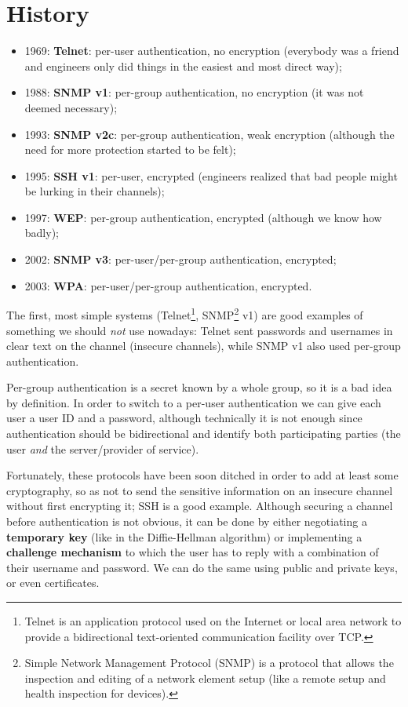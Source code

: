 
\section{History}
\begin{itemize}
	\item 1969: \textbf{Telnet}: per-user authentication, no encryption (everybody was a friend and engineers only did things in the easiest and most direct way);
	\item 1988: \textbf{SNMP v1}: per-group authentication, no encryption (it was not deemed necessary);
	\item 1993: \textbf{SNMP v2c}: per-group authentication, weak encryption (although the need for more protection started to be felt);
	\item 1995: \textbf{SSH v1}: per-user, encrypted (engineers realized that bad people might be lurking in their channels);
	\item 1997: \textbf{WEP}: per-group authentication, encrypted (although we know how badly);
	\item 2002: \textbf{SNMP v3}: per-user/per-group authentication, encrypted;
	\item 2003: \textbf{WPA}: per-user/per-group authentication, encrypted.
\end{itemize}

The first, most simple systems (Telnet\footnote{Telnet is an application protocol used on the Internet or local area network to provide a bidirectional text-oriented communication facility over TCP.}, SNMP\footnote{Simple Network Management Protocol (SNMP) is a protocol that allows the inspection and editing of a network element setup (like a remote setup and health inspection for devices).} v1) are good examples of something we should \textit{not} use nowadays: Telnet sent passwords and usernames in clear text on the channel (insecure channels), while SNMP v1 also used per-group authentication.

Per-group authentication is a secret known by a whole group, so it is a bad idea by definition. In order to switch to a per-user authentication we can give each user a user ID and a password, although technically it is not enough since authentication should be bidirectional and identify both participating parties (the user \textit{and} the server/provider of service).

Fortunately, these protocols have been soon ditched in order to add at least some cryptography, so as not to send the sensitive information on an insecure channel without first encrypting it; SSH is a good example. Although securing a channel before authentication is not obvious, it can be done by either negotiating a \textbf{temporary key} (like in the Diffie-Hellman algorithm) or implementing a \textbf{challenge mechanism} to which the user has to reply with a combination of their username and password. We can do the same using public and private keys, or even certificates.

